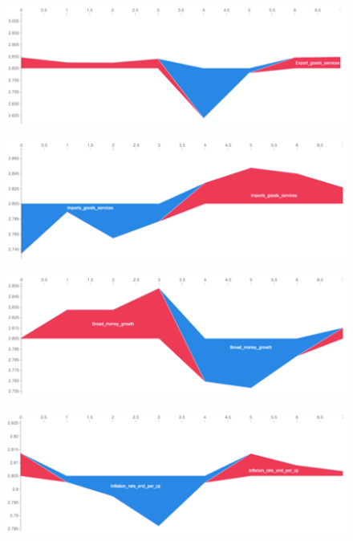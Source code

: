 \documentclass[12pt,italian, twoside]{report}
\begin{document}
\begin{figure}[t]
	\centering
	\includegraphics[width = 150mm]{immagini/exp.png}
\end{figure}
\begin{figure}[t]
	\centering
	\includegraphics[width = 150mm]{immagini/imp.png}
\end{figure}
\begin{figure}[t]
	\centering
	\includegraphics[width = 150mm]{immagini/bmg.png}
\end{figure}
\begin{figure}[t]
	\centering
	\includegraphics[width = 150mm]{immagini/inf.png}
\end{figure}
\end{document}
